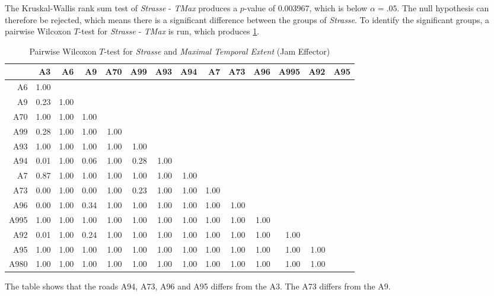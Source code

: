 The Kruskal-Wallis rank sum test of \textit{Strasse} - \textit{TMax} produces a $p$-value of 0.003967, which is below $\alpha=.05$. The null hypothesis can therefore be rejected, which means there is a significant difference between the groups of \textit{Strasse}. To identify the significant groups, a pairwise Wilcoxon $T$-test for \textit{Strasse} - \textit{TMax} is run, which produces \cref{tbl:wilcoxon_baysis_effector_Strasse_TMax}. 
\begin{table}[ht]
	\tiny
	\centering
	\begin{tabular}{rrrrrrrrrrrrrr}
		\toprule
		     & A3 & A6 & A9 & A70 & A99 & A93 & A94 & A7 & A73 & A96 & A995 & A92 & A95 \\ 
		\midrule
		A6   & 1.00 &  &  &  &  &  &  &  &  &  &  &  &  \\ 
		A9   & 0.23 & 1.00 &  &  &  &  &  &  &  &  &  &  &  \\ 
		A70  & 1.00 & 1.00 & 1.00 &  &  &  &  &  &  &  &  &  &  \\ 
		A99  & 0.28 & 1.00 & 1.00 & 1.00 &  &  &  &  &  &  &  &  &  \\ 
		A93  & 1.00 & 1.00 & 1.00 & 1.00 & 1.00 &  &  &  &  &  &  &  &  \\ 
		A94  & 0.01 & 1.00 & 0.06 & 1.00 & 0.28 & 1.00 &  &  &  &  &  &  &  \\ 
		A7   & 0.87 & 1.00 & 1.00 & 1.00 & 1.00 & 1.00 & 1.00 &  &  &  &  &  &  \\ 
		A73  & 0.00 & 1.00 & 0.00 & 1.00 & 0.23 & 1.00 & 1.00 & 1.00 &  &  &  &  &  \\ 
		A96  & 0.00 & 1.00 & 0.34 & 1.00 & 1.00 & 1.00 & 1.00 & 1.00 & 1.00 &  &  &  &  \\ 
		A995 & 1.00 & 1.00 & 1.00 & 1.00 & 1.00 & 1.00 & 1.00 & 1.00 & 1.00 & 1.00 &  &  &  \\ 
		A92  & 0.01 & 1.00 & 0.24 & 1.00 & 1.00 & 1.00 & 1.00 & 1.00 & 1.00 & 1.00 & 1.00 &  &  \\ 
		A95  & 1.00 & 1.00 & 1.00 & 1.00 & 1.00 & 1.00 & 1.00 & 1.00 & 1.00 & 1.00 & 1.00 & 1.00 &  \\ 
		A980 & 1.00 & 1.00 & 1.00 & 1.00 & 1.00 & 1.00 & 1.00 & 1.00 & 1.00 & 1.00 & 1.00 & 1.00 &  \\ 
		\bottomrule
	  \end{tabular}
    \caption{Pairwise Wilcoxon $T$-test for \textit{Strasse} and \textit{Maximal Temporal Extent} (Jam Effector)}
    \label{tbl:wilcoxon_baysis_effector_Strasse_TMax}
\end{table}
The table shows that the roads A94, A73, A96 and A95 differs from the A3. The A73 differs from the A9.
